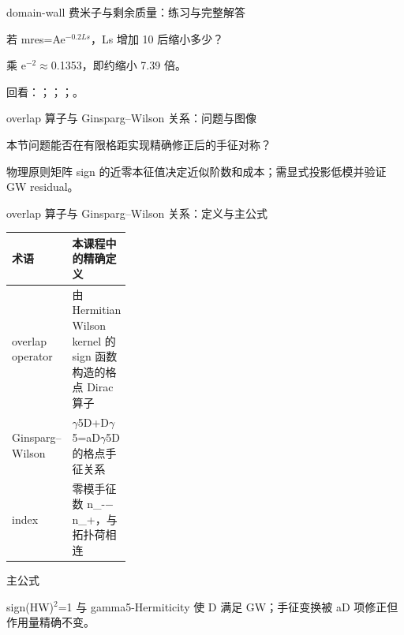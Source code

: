 \begin{frame}[t]{domain-wall 费米子与剩余质量：练习与完整解答}
\footnotesize
\begin{block}{}若 mres=Ae\ensuremath{^{-0.2Ls}}，Ls 增加 10 后缩小多少？\end{block}
\begin{exampleblock}{}乘 e\ensuremath{^{-2}}\ensuremath{\approx}0.1353，即约缩小 7.39 倍。\end{exampleblock}
\vfill
\scriptsize 回看：；；；。
\end{frame}

\begin{frame}[t]{overlap 算子与 Ginsparg--Wilson 关系：问题与图像}
\footnotesize
\begin{block}{本节问题}能否在有限格距实现精确修正后的手征对称？\end{block}
\begin{block}{物理原则}\quad 矩阵 sign 的近零本征值决定近似阶数和成本；需显式投影低模并验证 GW residual。\end{block}
\end{frame}

\begin{frame}[t]{overlap 算子与 Ginsparg--Wilson 关系：定义与主公式}
\footnotesize\begin{tabularx}{\linewidth}{p{0.30\linewidth}Y}
\toprule 术语 & 本课程中的精确定义\\\midrule
{} overlap operator & 由 Hermitian Wilson kernel 的 sign 函数构造的格点 Dirac 算子\\
 Ginsparg--Wilson & \ensuremath{\gamma}5D+D\ensuremath{\gamma}5=aD\ensuremath{\gamma}5D 的格点手征关系\\
 index & 零模手征数 n\_-\ensuremath{-}n\_+，与拓扑荷相连\\
\bottomrule\end{tabularx}\vspace{0.15cm}
\begin{block}{ 主公式}\centering{}\end{block}
sign(HW)\ensuremath{^{2}}=1 与 gamma5-Hermiticity 使 D 满足 GW；手征变换被 aD 项修正但作用量精确不变。
\end{frame}


